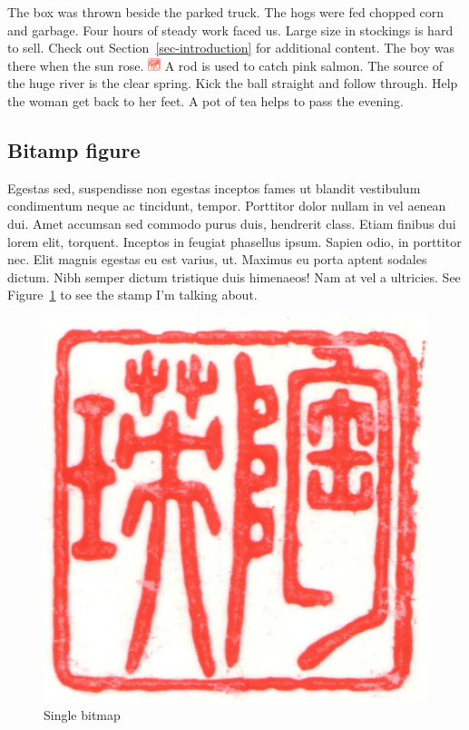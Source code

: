 \documentclass[
  9pt,
  letterpaper,
  DIV=11,
  numbers=noendperiod]{scrartcl}
\begin{document}
The box was thrown beside the parked truck. The hogs were fed chopped
corn and garbage. Four hours of steady work faced us. Large size in
stockings is hard to sell. Check out Section~\ref{sec-introduction} for
additional content. The boy was there when the sun rose.
\includegraphics[width=\textwidth,height=1em]{stamp1a.jpg} A rod is used
to catch pink salmon. The source of the huge river is the clear spring.
Kick the ball straight and follow through. Help the woman get back to
her feet. A pot of tea helps to pass the evening.

\newpage{}

\hypertarget{bitamp-figure}{%
\subsection{Bitamp figure}\label{bitamp-figure}}

Egestas sed, suspendisse non egestas inceptos fames ut blandit
vestibulum condimentum neque ac tincidunt, tempor. Porttitor dolor
nullam in vel aenean dui. Amet accumsan sed commodo purus duis,
hendrerit class. Etiam finibus dui lorem elit, torquent. Inceptos in
feugiat phasellus ipsum. Sapien odio, in porttitor nec. Elit magnis
egestas eu est varius, ut. Maximus eu porta aptent sodales dictum. Nibh
semper dictum tristique duis himenaeos! Nam at vel a ultricies. See
Figure~\ref{fig-stamp1a} to see the stamp I'm talking about.

\begin{figure}

{\centering \includegraphics{stamp1a.jpg}

}

\caption{\label{fig-stamp1a}Single bitmap}

\end{figure}
\end{document}
